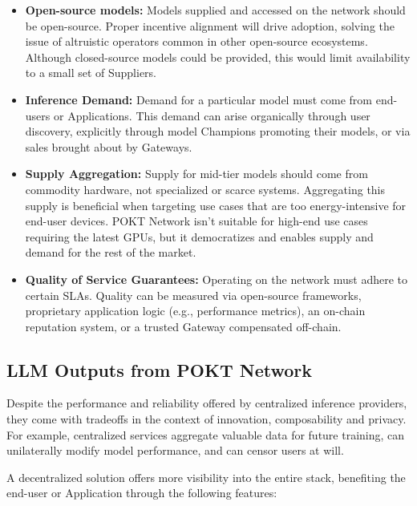 \documentclass[conference,compsoc]{IEEEtran}
\begin{document}
\begin{itemize}
    \item \textbf{Open-source models:} Models supplied and accessed on the network should be open-source. Proper incentive alignment will drive adoption, solving the issue of altruistic operators common in other open-source ecosystems. Although closed-source models could be provided, this would limit availability to a small set of Suppliers.

    \item \textbf{Inference Demand:} Demand for a particular model must come from end-users or Applications. This demand can arise organically through user discovery, explicitly through model Champions promoting their models, or via sales brought about by Gateways.

    \item \textbf{Supply Aggregation:} Supply for mid-tier models should come from commodity hardware, not specialized or scarce systems. Aggregating this supply is beneficial when targeting use cases that are too energy-intensive for end-user devices. POKT Network isn't suitable for high-end use cases requiring the latest GPUs, but it democratizes and enables supply and demand for the rest of the market.

    \item \textbf{Quality of Service Guarantees:} Operating on the network must adhere to certain SLAs. Quality can be measured via open-source frameworks, proprietary application logic (e.g., performance metrics), an on-chain reputation system, or a trusted Gateway compensated off-chain.

\end{itemize}

\subsection{LLM Outputs from POKT Network}

Despite the performance and reliability offered by centralized inference providers, they come with tradeoffs in the context of innovation, composability and privacy. For example, centralized services aggregate valuable data for future training, can unilaterally modify model performance, and can censor users at will.

A decentralized solution offers more visibility into the entire stack, benefiting the end-user or Application through the following features:
\end{document}
